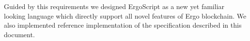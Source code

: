 \documentclass[11pt]{article}
\begin{document}
Guided by this requirements we designed ErgoScript as a new yet familiar
looking language which directly support all novel features of Ergo blockchain.
We also implemented reference implementation of the specification described in this document.

















\appendix







\end{document}
